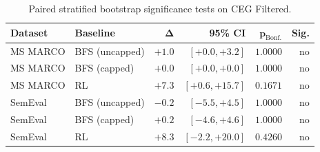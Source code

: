 \begin{table}[H]
\centering
\small
\setlength{\tabcolsep}{5pt}
\caption{Paired stratified bootstrap significance tests on CEG Filtered.}
\label{tab:f1-significance-ceg}
\begin{tabular}{@{}p{4.2cm}lrrrr@{}}
\toprule
\textbf{Dataset} & \textbf{Baseline} & $\boldsymbol{\Delta}$ & \textbf{95\% CI} & $\boldsymbol{p_{\mathrm{Bonf.}}}$ & \textbf{Sig.} \\
\midrule
MS MARCO & BFS (uncapped) & $+1.0$ & $[+0.0,+3.2]$ & $1.0000$ & no \\
MS MARCO & BFS (capped)   & $+0.0$ & $[+0.0,+0.0]$ & $1.0000$ & no \\
MS MARCO & RL             & $+7.3$ & $[+0.6,+15.7]$ & $0.1671$ & no \\
SemEval  & BFS (uncapped) & $-0.2$ & $[-5.5,+4.5]$ & $1.0000$ & no \\
SemEval  & BFS (capped)   & $+0.2$ & $[-4.6,+4.6]$ & $1.0000$ & no \\
SemEval  & RL             & $+8.3$ & $[-2.2,+20.0]$ & $0.4260$ & no \\
\bottomrule
\end{tabular}
\end{table}
